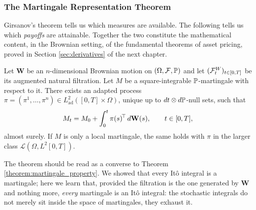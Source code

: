 \subsubsection*{The Martingale Representation Theorem}

Girsanov's theorem tells us which measures are available. The following tells us which \emph{payoffs} 
are attainable. Together the two constitute the 
mathematical content, in the Brownian setting, of the fundamental theorems of asset pricing, proved in Section
\ref{sec:derivatives} of the next chapter.

\begin{theorem}\label{thm:mrt}
Let $\mathbf{W}$ be an $n$-dimensional Brownian motion on $(\Omega,\mathcal{F},\mathbb{P})$ and let
$(\mathcal{F}^{W}_t)_{t\in[0,T]}$ be its augmented natural filtration. Let $M$ be a square-integrable
$\mathbb{P}$-martingale with respect to it. There exists an adapted process
$\pi = (\pi^1,\dots,\pi^n) \in L^2_{\mathrm{ad}}([0,T]\times\Omega)$, unique up to
$dt\otimes d\mathbb{P}$-null sets, such that
\begin{equation}\label{eq:mrt}
M_t = M_0 + \int_0^t \pi(s)^{\!\top} \, d\mathbf{W}(s), \qquad t \in [0,T],
\end{equation}
almost surely. If $M$ is only a local martingale, the same holds with $\pi$ in the larger class 
$\mathcal{L}(\Omega,L^2[0,T])$. \qedopentext
\end{theorem}

The theorem should be read as a converse to Theorem \ref{theorem:martingale_property}. We 
showed that every Itô integral is a martingale; here we learn that, provided the filtration is the 
one generated by $\mathbf{W}$ and nothing more, \emph{every} martingale is an Itô integral: the
stochastic integrals do not merely sit inside the space of martingales, they exhaust it.


